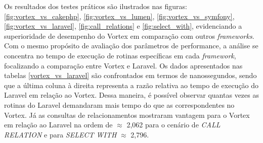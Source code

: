 Os resultados dos testes práticos são ilustrados nas figuras: \ref{fig:vortex_vs_cakephp}, \ref{fig:vortex_vs_lumen}, \ref{fig:vortex_vs_symfony}, \ref{fig:vortex_vs_laravel}, \ref{fig:call_relations} e \ref{fig:select_with}, evidenciando a superioridade de desempenho do Vortex em comparação com outros \textit{frameworks}. Com o mesmo propósito de avaliação dos parâmetros de performance, a análise se concentra no tempo de execução de rotinas específicas em cada \textit{framework}, focalizando a comparação entre Vortex e Laravel. Os dados apresentados nas tabelas \ref{vortex_vs_laravel} são confrontados em termos de nanossegundos, sendo que a última coluna à direita representa a razão relativa ao tempo de execução do Laravel em relação ao Vortex. Dessa maneira, é possível observar quantas vezes as rotinas do Laravel demandaram mais tempo do que as correspondentes no Vortex. Já as consultas de relacionamentos mostraram vantagem para o Vortex em relação ao Laravel na ordem de $\approx$ 2,062 para o cenário de \textit{CALL RELATION} e para \textit{SELECT WITH} $\approx$ 2,796.